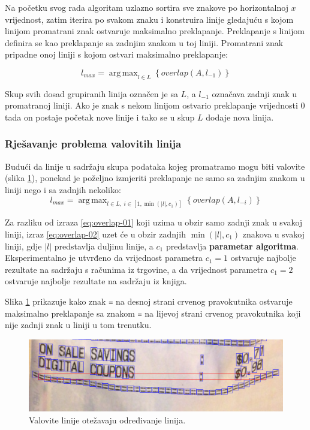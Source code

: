 \documentclass[times, utf8, zavrsni]{fer}
\DeclareMathOperator*{\argmax}{arg\,max}
\begin{document}
Na početku svog rada algoritam uzlazno sortira sve znakove po horizontalnoj $x$
vrijednost, zatim iterira po svakom znaku i konstruira linije gledajuću s kojom
linijom promatrani znak ostvaruje maksimalno preklapanje. Preklapanje s linijom
definira se kao preklapanje sa zadnjim znakom u toj liniji. Promatrani znak
pripadne onoj liniji s kojom ostvari maksimalno preklapanje:

\begin{equation}
\label{eq:overlap-01}
l_{max} = \argmax_{l \in L}\left\{\textit{overlap}(A, l_{-1})\right\}
\end{equation}

Skup svih dosad grupiranih linija označen je sa $L$,
a $l_{-1}$ označava zadnji znak u promatranoj liniji. Ako je znak s nekom
linijom ostvario preklapanje vrijednosti $0$ tada on postaje početak nove
linije i tako se u skup $L$ dodaje nova linija.


\subsubsection{Rješavanje problema valovitih linija}
Budući da linije u sadržaju skupa podataka kojeg promatramo mogu biti valovite
(slika \ref{fig:aligner-01}), ponekad je poželjno izmjeriti preklapanje ne samo
sa zadnjim znakom u liniji nego i sa zadnjih nekoliko:
\begin{equation}
\label{eq:overlap-02}
l_{max} = \argmax_{l \in L,\ i \in [1, \min(|l|, c_1)]}\left\{\textit{overlap}(A, l_{-i})\right\}
\end{equation}

Za razliku od izraza \ref{eq:overlap-01} koji uzima u obzir samo zadnji znak u
svakoj liniji, izraz \ref{eq:overlap-02} uzet će u obzir zadnjih
$\min(|l|, c_1)$
znakova u svakoj liniji, gdje $|l|$ predstavlja duljinu linije, a $c_1$
predstavlja \textbf{parametar algoritma}. Eksperimentalno je utvrđeno da
vrijednost parametra $c_1 = 1$ ostvaruje najbolje rezultate na sadržaju s
računima iz trgovine, a da vrijednost parametra $c_1 = 2$ ostvaruje najbolje
rezultate na sadržaju iz knjiga.

Slika \ref{fig:aligner-01} prikazuje kako znak \lstinline{=} na desnoj strani
crvenog pravokutnika ostvaruje maksimalno preklapanje sa znakom \lstinline{=}
na lijevoj strani crvenog pravokutnika koji nije zadnji znak u liniji u tom
trenutku.
\begin{figure}[htb]
    \centering
    \captionsetup{justification=centering,margin=2cm}
    \includegraphics[width=\textwidth]{images/aligner-01.png}
    \caption{Valovite linije otežavaju određivanje linija.}
    \label{fig:aligner-01}
\end{figure}
\end{document}
